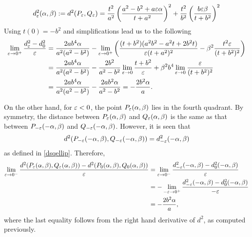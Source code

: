 \begin{eg}
\begin{equation}
        d_\varepsilon^2(\alpha,\beta):=d^2(P_\varepsilon,Q_\varepsilon)=\frac{t^2}{a^2}\left(\frac{a^2-b^2+a\varepsilon\alpha}{t+a^2}\right)^2+\frac{t^2}{b^2}\left(\frac{b\varepsilon\beta}{t+b^2}\right)^2\label{dsqellip}
    \end{equation}
    Using $t(0)=-b^2$ and simplifications lead us to the following
\begin{align*}
    \lim_{\varepsilon\to 0^+}\frac{d_\varepsilon^2-d_0^2}{\varepsilon} & =\frac{2ab^4\alpha}{a^2(a^2-b^2)}-\lim_{\varepsilon\to 0^+}\left(\frac{(t+b^2)(a^2b^2-a^2 t+2b^2t)}{\varepsilon(t+a^2)^2}-\beta^2 \frac{t^2\varepsilon}{(t+b^2)^2}\right)\\
    & = \frac{2ab^4\alpha}{a^2(a^2-b^2)}-\frac{2b^2}{a^2-b^2}\lim_{\varepsilon\to 0}\frac{t+b^2}{\varepsilon}+\beta^2 b^4\lim_{\varepsilon\to 0}\frac{\varepsilon}{(t+b^2)^2}\\
    & = \frac{2ab^4\alpha}{a^2(a^2-b^2)}-\frac{2ab^2\alpha}{a^2-b^2}=-\frac{2b^2\alpha}{a}.
\end{align*}
    
\hf On the other hand, for $\varepsilon<0$, the point $P_\varepsilon(\alpha,\beta)$ lies in the fourth quadrant. By symmetry, the distance between $P_\varepsilon(\alpha,\beta)$ and $Q_\varepsilon(\alpha,\beta)$ is the same as that between $P_{-\varepsilon}(-\alpha,\beta)$ and $Q_{-\varepsilon}(-\alpha,\beta)$. However, it is seen that 
    \begin{displaymath}
        d^2(P_{-\varepsilon}(-\alpha,\beta), Q_{-\varepsilon}(-\alpha,\beta))=d^2_{-\varepsilon}(-\alpha,\beta)
    \end{displaymath}
    as defined in \eqref{dsqellip}. Therefore,
    \begin{align*}
        \lim_{\varepsilon\to 0^-}\frac{d^2(P_{\varepsilon}(\alpha,\beta), Q_{\varepsilon}(\alpha,\beta))-d^2(P_{0}(\alpha,\beta), Q_{0}(\alpha,\beta))}{\varepsilon} & =  \lim_{\varepsilon\to 0^-}\frac{d^2 _{-\varepsilon}(-\alpha,\beta)-d^2 _0(-\alpha,\beta)}{\varepsilon}\\
        & =  -\lim_{-\varepsilon\to 0^+}\frac{d^2 _{-\varepsilon}(-\alpha,\beta)-d^2 _0(-\alpha,\beta)}{-\varepsilon}\\
        & = -\frac{2b^2\alpha}{a},
    \end{align*}
    where the last equality follows from the right hand derivative of $d^2$, as computed previously.
    

\end{eg}
